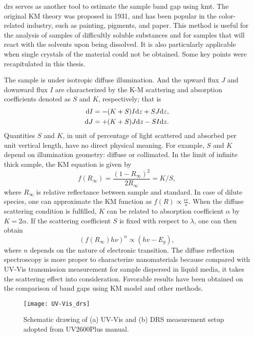 \Gls{drs} serves as another tool to estimate the sample band gap using \gls{kmt}.\cite{Tandon1970} The original KM theory was proposed in 1931,\cite{Kubelka1931} and has been popular in the color-related industry, such as painting, pigments, and paper. This method is useful for the analysis of samples of difficultly soluble substances and for samples that will react with the solvents upon being dissolved. It is also particularly applicable when single crystals of the material could not be obtained. Some key points were recapitulated in this thesis.

The sample is under isotropic diffuse illumination. And the upward flux $J$ and downward flux $I$ are characterized by the K-M scattering and absorption coefficients denoted as $S$ and $K$, respectively; that is
\begin{align}
\mathrm{d} I &= - (K + S)I \mathrm{d} z + SJ\mathrm{d} z,\\
\mathrm{d} J &= + (K + S)J \mathrm{d} z - SI\mathrm{d} z.
\end{align}
Quantities $S$ and $K$, in unit of percentage of light scattered and absorbed per unit vertical length, have no direct physical meaning. For example, $S$ and $K$ depend on illumination geometry: diffuse or collimated. In the limit of infinite thick sample, the KM equation is given by
\begin{equation}
f(R_\infty) = \frac{(1-R_\infty)^2}{2R_\infty} = K/S,
\end{equation}
where $R_\infty$ is relative reflectance between sample and standard. In case of dilute species, one can approximate the KM function as $f(R) \propto \frac{\epsilon c}{s}$. When the diffuse scattering condition is fulfilled, $K$ can be related to absorption coefficient $\alpha$ by $K = 2\alpha$. If the scattering coefficient $S$ is fixed with respect to $\lambda$, one can then obtain
\begin{equation}
(f(R_\infty) h \nu)^n \propto (hv - E_g),
\end{equation}
where $n$ depends on the nature of electronic transition. The diffuse reflection spectroscopy is more proper to characterize nanomaterials because compared with UV-Vis transmission measurement for sample dispersed in liquid media, it takes the scattering effect into consideration. Favorable results have been obtained on the comparison of band gaps using KM model and other methods.\cite{Tandon1970,Morales2007} 

\begin{figure}[htb]
\centering
\texttt{[image: UV-Vis\_drs]}
\caption[Schematic drawing of UV-Vis and DRS measurement]{Schematic drawing of (a) UV-Vis and (b) DRS measurement setup adopted from UV2600Plus manual.}
\label{fig:ch2uvvis}
\end{figure}

